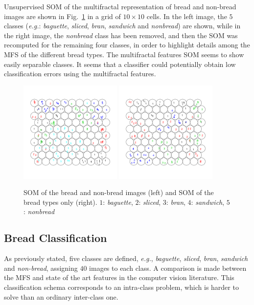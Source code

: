 \documentclass[a4paper,10pt]{article}
\begin{document}
Unsupervised SOM of the multifractal representation of bread and non-bread images are shown in Fig.~\ref{fig:somfractal} in a grid of $10\times10$ cells. In the left image, the $5$ classes ({\em e.g.}: {\em baguette}, {\em sliced}, {\em bran}, {\em sandwich} and {\em nonbread}) are shown, while in the right image, the {\em nonbread} class has been removed, and then the SOM was recomputed for the remaining four classes, in order to highlight details among the MFS of the different bread types. The multifractal features SOM seems to show easily separable classes. It seems that a classifier could potentially obtain low classification errors using the multifractal features.
\begin{figure}
\begin{centering}
\includegraphics[width=0.45\textwidth]{images/sommultifractal}
\includegraphics[width=0.45\textwidth]{images/sombreadmultifractal}
\caption{SOM of the bread and non-bread images (left) and SOM of the bread types only (right). $1$: {\em baguette}, $2$: {\em sliced}, $3$: {\em bran}, $4$: {\em sandwich}, $5$: {\em nonbread} }
\label{fig:somfractal}
\end{centering}
\end{figure}

\subsection{Bread Classification}
\label{sec:10}
As previously stated, five classes are defined, {\em e.g.}, {\em baguette}, {\em sliced}, {\em bran}, {\em sandwich} and {\em non-bread}, assigning $40$ images to each class. A comparison is made between the MFS and state of the art features in the computer vision literature. This classification schema corresponds to an intra-class problem, which is harder to solve than an ordinary inter-class one. 
\end{document}
